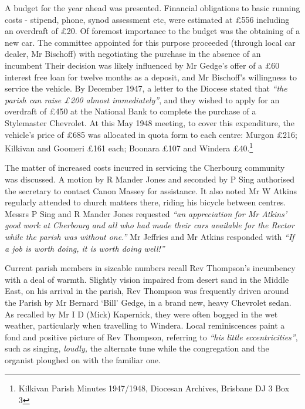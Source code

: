 A budget for the year ahead was presented. Financial obligations to basic running costs - stipend, phone, synod assessment etc, were estimated at \pounds556 including an overdraft of \pounds20. Of foremost importance to the budget was the obtaining of a new car. The committee appointed for this purpose proceeded (through local car dealer, Mr Bischoff) with negotiating the purchase in the absence of an incumbent Their decision was likely influenced by Mr Gedge's offer of a \pounds60 interest free loan for twelve months as a deposit, and Mr Bischoff's willingness to service the vehicle. By December 1947, a letter to the Diocese stated that \emph{``the parish can raise \pounds200 almost immediately''}, and they wished to apply for an overdraft of \pounds450 at the National Bank to complete the purchase of a Stylemaster Chevrolet. At this May 1948 meeting, to cover this expenditure, the vehicle's price of \pounds685 was allocated in quota form to each centre: Murgon \pounds216; Kilkivan and Goomeri \pounds161 each; Boonara \pounds107 and Windera \pounds40.\footnote{Kilkivan Parish Minutes 1947/1948, Diocesan Archives, Brisbane DJ 3 Box 3}


The matter of increased costs incurred in servicing the Cherbourg community was discussed. A motion by R Mander Jones and seconded by P Sing authorised the secretary to contact Canon Massey for assistance. It also noted Mr W Atkins regularly attended to church matters there, riding his bicycle between centres. Messrs P Sing and R Mander Jones requested \emph{``an appreciation for Mr Atkins' good work at Cherbourg and all who had made their cars available for the Rector while the parish was without one.''} Mr Jeffries and Mr Atkins responded with \emph{``If a job is worth doing, it is worth doing well!''}



Current parish members in sizeable numbers recall Rev Thompson's incumbency with a deal of warmth. Slightly vision impaired from desert sand in the Middle East, on his arrival in the parish, Rev Thompson was frequently driven around the Parish by Mr Bernard `Bill' Gedge, in a brand new, heavy Chevrolet sedan. As recalled by Mr I D (Mick) Kapernick, they were often bogged in the wet weather, particularly when travelling to Windera. Local reminiscences paint a fond and positive picture of Rev Thompson, referring to \emph{``his little eccentricities''}, such as singing, \emph{loudly,} the alternate tune while the congregation and the organist ploughed on with the familiar one.



